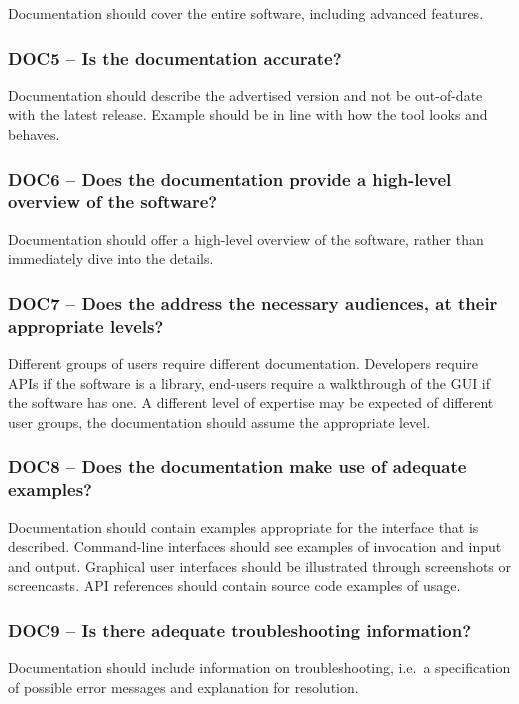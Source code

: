 \documentclass[a4paper,11pt]{article}
\begin{document}
Documentation should cover the entire software, including advanced features.

\subsubsection{DOC5 -- Is the documentation accurate?}

Documentation should describe the advertised version and not be out-of-date
with the latest release. Example should be in line with how the tool looks and
behaves.

\subsubsection{DOC6 -- Does the documentation provide a high-level overview of the software?}

Documentation should offer a high-level overview of the software, rather
than immediately dive into the details.

\subsubsection{DOC7 -- Does the address the necessary audiences, at their appropriate levels?}

Different groups of users require different documentation. Developers require
APIs if the software is a library, end-users require a walkthrough of the GUI
if the software has one. A different level of expertise may be expected of
different user groups, the documentation should assume the appropriate level.

\subsubsection{DOC8 -- Does the documentation make use of adequate examples?}

Documentation should contain examples appropriate for the interface that is
described. Command-line interfaces should see examples of invocation and input
and output. Graphical user interfaces should be illustrated through screenshots or
screencasts. API references should contain source code examples of usage.

\subsubsection{DOC9 -- Is there adequate troubleshooting information?}

Documentation should include information on troubleshooting, i.e.\ a
specification of possible error messages and explanation for resolution.
\end{document}
